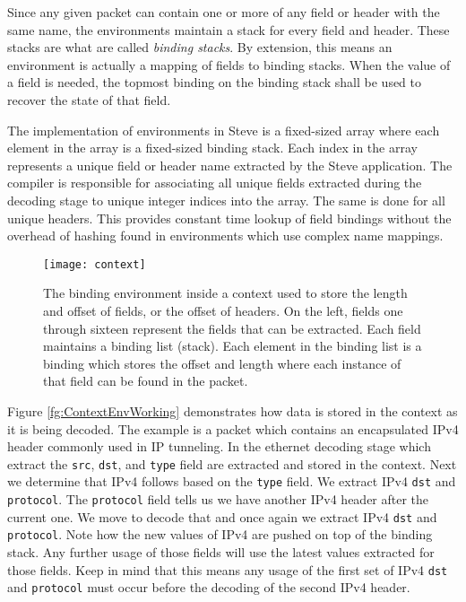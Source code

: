 Since any given packet can contain one or more of any field or header with the same name, the environments maintain a stack for every field and header. These stacks are what are called \textit{binding stacks}. By extension, this means an environment is actually a mapping of fields to binding stacks. When the value of a field is needed, the topmost binding on the binding stack shall be used to recover the state of that field.

The implementation of environments in Steve is a fixed-sized array where each element in the array is a fixed-sized binding stack. Each index in the array represents a unique field or header name extracted by the Steve application. The compiler is responsible for associating all unique fields extracted during the decoding stage to unique integer indices into the array. The same is done for all unique headers. This provides constant time lookup of field bindings without the overhead of hashing found in environments which use complex name mappings.

\begin{figure}[ht]
\centering
		\texttt{[image: context]}
\caption{The binding environment inside a context used to store the length and offset of fields, or the offset of headers. On the left, fields one through sixteen represent the fields that can be extracted. Each field maintains a binding list (stack). Each element in the binding list is a binding which stores the offset and length where each instance of that field can be found in the packet. }
\label{fg:ContextEnv}
\end{figure}

Figure \ref{fg:ContextEnvWorking} demonstrates how data is stored in the context as it is being decoded. The example is a packet which contains an encapsulated IPv4 header commonly used in IP tunneling. In the ethernet decoding stage which extract the \texttt{src}, \texttt{dst}, and \texttt{type} field are extracted and stored in the context. Next we determine that IPv4 follows based on the \texttt{type} field. We extract IPv4 \texttt{dst} and \texttt{protocol}. The \texttt{protocol} field tells us we have another IPv4 header after the current one. We move to decode that and once again we extract IPv4 \texttt{dst} and \texttt{protocol}. Note how the new values of IPv4 are pushed on top of the binding stack. Any further usage of those fields will use the latest values extracted for those fields. Keep in mind that this means any usage of the first set of IPv4 \texttt{dst} and \texttt{protocol} must occur before the decoding of the second IPv4 header.

